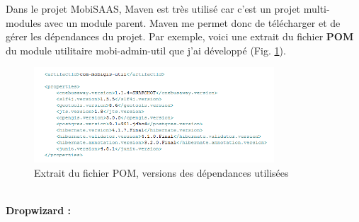 \begin{itemize}
Dans le projet MobiSAAS, Maven est très utilisé car c'est un projet multi-modules avec un module parent. Maven me permet donc de télécharger et de gérer les dépendances du projet. Par exemple, voici une extrait du fichier \textbf{POM} du module utilitaire \og mobi-admin-util \fg que j'ai développé (Fig. \ref{fig:MavenPOM}).\\

\begin{figure}[!h]
	\centering
		\includegraphics[width=0.8\textwidth]{images/Maven_POM_properties_Mobi-Admin-util.PNG}
	\caption{\label{fig:MavenPOM}Extrait du fichier POM, versions des dépendances utilisées}
\end{figure}
\\

\textbf{Dropwizard :}\label{Dropwizard}


\end{itemize}
